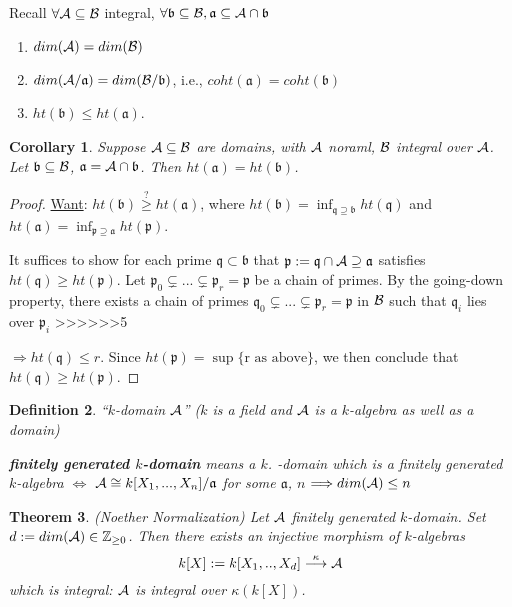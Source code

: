\documentclass[11pt]{article}
\newtheorem{thm}{Theorem}[section]
\newtheorem{cor}[thm]{Corollary}
\newtheorem{dfn}[thm]{Definition}
\newcommand{\intg}{\mathbb Z}
\newcommand{\sca}{{\mathfrak a}}
\newcommand{\scb}{{\mathfrak b}}
\newcommand{\scp}{{\mathfrak p}}
\newcommand{\scq}{\mathfrak q}
\newcommand{\cala}{{\cal A}}
\newcommand{\calb}{{\cal B}}
\newcommand{\Lrta}{\Longrightarrow}
\newcommand{\lrta}{\longrightarrow}
\newcommand{\Llrta}{\Longleftrightarrow}
\begin{document}
Recall $\forall \cala\subseteq \calb$ integral, $\forall \scb\subseteq \calb,\sca\subseteq \cala\cap \scb$
\begin{enumerate}[label=(\roman*)]
\item $dim(\cala)=dim(\calb)$
\item $dim(\cala/\sca)=dim(\calb/\scb)$, i.e., $
coht(\sca)=coht(\scb)$
\item $ht(\scb)\leq ht(\sca)$.
\end{enumerate}
\begin{cor}
Suppose $\cala\subseteq \calb$ are domains, with $\cala$ noraml, $\calb$ integral over $\cala$. Let $\scb\subseteq \calb$, $\sca=\cala\cap \scb$. Then $ht(\sca)=ht(\scb)$.
\end{cor}
\begin{proof}
\underline{Want}: $ht(\scb)\overset{?}{\geq} ht(\sca)$, where $ht(\scb)=\inf_{\scq\supseteq \scb} ht(\scq)$ and  $ht(\sca)=\inf_{\scp\supseteq \sca} ht(\scp)$.

It suffices to show for each prime $\scq\subset\scb$ that $\scp:=\scq\cap \cala\supseteq \sca$ satisfies $ht(\scq)\geq ht(\scp)$. Let $\scp_0\subsetneq ...\subsetneq \scp_r=\scp$ be a chain of primes. By the going-down property, there exists a chain of primes $\scq_0\subsetneq ...\subsetneq \scp_r=\scp$ in $\calb$ such that $\scq_i$ lies over $\scp_i$
>>>>>>5

$\Lrta ht(\scq)\leq r$. Since $ht(\scp)=\sup\{\text{r as above}\}$, we then conclude that $ht(\scq)\geq ht(\scp)$.
\end{proof}

\begin{dfn}
``$k$-domain $\cala$'' ($k$ is a field and $\cala$ is a $k$-algebra as well as a domain)

\textbf{finitely generated $k$-domain} means a $k$.
-domain which is a finitely generated $k$-algebra
$\Llrta$ $\cala\cong k[X_1,...,X_n]/\sca$ for some $\sca$, $n$ $\Lrta dim(\cala)\leq n$
\end{dfn}

\begin{thm}\label{thm:Noether_Normalization}(Noether Normalization)
Let $\cala$ finitely generated $k$-domain. Set $d:=dim(\cala)\in \intg_{\geq 0}$. Then there exists an injective morphism of $k$-algebras
$$
k[X]:=k[X_1,..,X_d]\overset{\kappa}{\lrta} \cala
$$
which is integral: $\cala$ is integral over $\kappa(k[X])$.
\end{thm}
\end{document}
